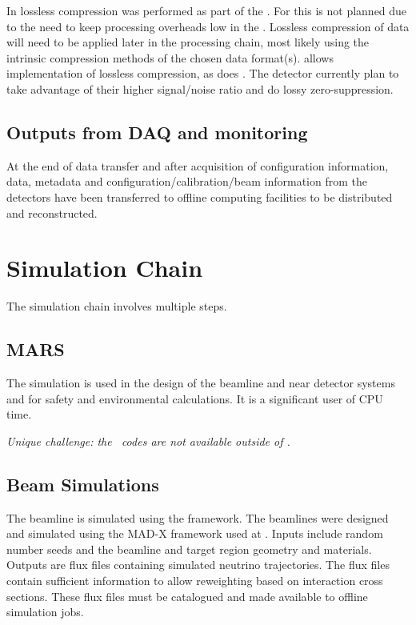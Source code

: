\documentclass[../main-v1.tex]{subfiles}
\begin{document}
In  lossless compression was performed as part of the . For  this is not planned due to the need to keep processing overheads low in the . Lossless compression of   data will need to be applied later in the processing chain, most likely using the intrinsic compression methods of the chosen data format(s).   allows implementation of lossless compression, as does .  The  detector currently plan to take advantage of their higher signal/noise ratio and do lossy zero-suppression. 


\subsection{Outputs from DAQ and monitoring}

At the end of data transfer and after acquisition of configuration information,  %
data, metadata and configuration/calibration/beam information from the detectors  have been transferred to offline computing facilities to  be distributed and reconstructed. 


\section{Simulation Chain }

% 
The simulation chain involves multiple steps.

\subsection{MARS}
The \cite{abs1} simulation is used in the design of the beamline and near detector systems and  for safety and environmental calculations.  It is a significant user of CPU time. 

{\it Unique challenge: the \ codes are not available outside of .}

\subsection{Beam Simulations}
The  
beamline is simulated using the  framework.  The  beamlines were designed and simulated using the MAD-X framework used at \cite{PhysRevAccelBeams.20.111001}.
Inputs include random number seeds and the beamline and target region geometry and materials.  Outputs are flux files containing simulated neutrino trajectories.  The flux files contain sufficient information to allow reweighting based on interaction cross sections.  These flux files must be catalogued and made available to offline simulation jobs.
\end{document}
